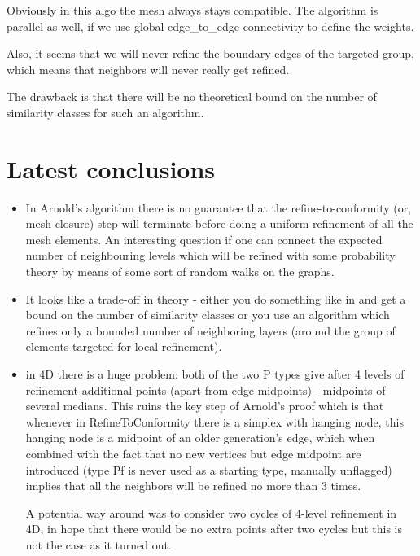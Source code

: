 \documentclass[a4paper,12pt]{amsart}
\numberwithin{equation}{section}
\begin{document}
Obviously in this algo the mesh always stays compatible. The algorithm is parallel as well, if we use global edge_to_edge connectivity to define the weights.

Also, it seems that we will never refine the boundary edges of the targeted group, which means that neighbors will never really get refined.

The drawback is that there will be no theoretical bound on the number of similarity classes for such an algorithm.


\section{Latest conclusions}
\begin{itemize}
	\item In Arnold's algorithm there is no guarantee that the refine-to-conformity (or, mesh closure) step will terminate before doing a uniform refinement of all the mesh elements. An interesting question if one can connect the expected number of neighbouring levels which will be refined with some probability theory by means of some sort of random walks on the graphs.
	\item It looks like a trade-off in theory - either you do something like in \cite{arnold} and get a bound on the number of similarity classes or you use an algorithm which refines only a bounded number of neighboring layers (around the group of elements targeted for local refinement).
	\item in 4D there is a huge problem: both of the two P types give after 4 levels of refinement additional points (apart from edge midpoints) - midpoints of several medians. This ruins the key step of Arnold's proof which is that whenever in RefineToConformity there is a simplex with hanging node, this hanging node is a midpoint of an older generation's edge, which when combined with the fact that no new vertices but edge midpoint are introduced (type Pf is never used as a starting type, manually unflagged) implies that all the neighbors will be refined no more than 3 times.
	
	A potential way around was to consider two cycles of 4-level refinement in 4D, in hope that there would be no extra points after two cycles but this is not the case as it turned out.
\end{itemize}
\end{document}
